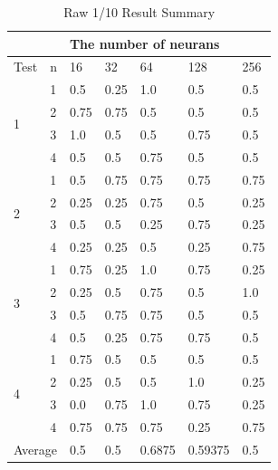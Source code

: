 \documentclass[draft,dvipsnames]{drexel-thesis}
\begin{document}
\begin{thesis}
\begin{table}[H]
\centering
\begin{tabular}{|l|l|l|l|l|l|l|}
\hline
                       &      & \multicolumn{5}{l|}{The number of neurans} \\ \hline
Test                   & n    & 16    & 32    & 64      & 128      & 256   \\ \hline
\multirow{4}{*}{1}     & 1    & 0.5   & 0.25  & 1.0     & 0.5      & 0.5   \\ \cline{2-7}
                       & 2    & 0.75  & 0.75  & 0.5     & 0.5      & 0.5   \\ \cline{2-7}
                       & 3    & 1.0   & 0.5   & 0.5     & 0.75     & 0.5   \\ \cline{2-7}
                       & 4    & 0.5   & 0.5   & 0.75    & 0.5      & 0.5   \\ \hline
\multirow{4}{*}{2}     & 1    & 0.5   & 0.75  & 0.75    & 0.75     & 0.75  \\ \cline{2-7}
                       & 2    & 0.25  & 0.25  & 0.75    & 0.5      & 0.25  \\ \cline{2-7}
                       & 3    & 0.5   & 0.5   & 0.25    & 0.75     & 0.25  \\ \cline{2-7}
                       & 4    & 0.25  & 0.25  & 0.5     & 0.25     & 0.75  \\ \hline
\multirow{4}{*}{3}     & 1    & 0.75  & 0.25  & 1.0     & 0.75     & 0.25  \\ \cline{2-7}
                       & 2    & 0.25  & 0.5   & 0.75    & 0.5      & 1.0   \\ \cline{2-7}
                       & 3    & 0.5   & 0.75  & 0.75    & 0.5      & 0.5   \\ \cline{2-7}
                       & 4    & 0.5   & 0.25  & 0.75    & 0.75     & 0.5   \\ \hline
\multirow{4}{*}{4}     & 1    & 0.75  & 0.5   & 0.5     & 0.5      & 0.5   \\ \cline{2-7}
                       & 2    & 0.25  & 0.5   & 0.5     & 1.0      & 0.25  \\ \cline{2-7}
                       & 3    & 0.0   & 0.75  & 1.0     & 0.75     & 0.25  \\ \cline{2-7}
                       & 4    & 0.75  & 0.75  & 0.75    & 0.25     & 0.75  \\ \hline
\multicolumn{2}{|l|}{Average} & 0.5   & 0.5   & 0.6875  & 0.59375  & 0.5   \\ \hline
\end{tabular}
\caption{Raw 1/10 Result Summary}
\label{Raw 1/10 Result Summary}
\end{table}



\end{thesis}
\end{document}
